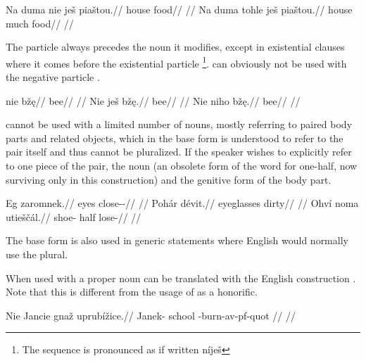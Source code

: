 \pex
\a
\begingl
\gla *Na duma nie ješ piaštou.//
\glb \Loc{} house   food//
\glft {}//
\endgl
\a
\begingl
\gla Na duma tohle ješ piaštou.//
\glb \Loc{} house much  food//
\glft {}//
\endgl
\xe

The particle  always precedes the noun it modifies, except in existential clauses where it comes before the existential particle \footnote{The sequence is pronounced as if written níješ }.  can obviously not be used with the negative particle .

\pex
\a
\begingl
\gla nie bž\k{e}//
\glb {} bee//
\glft {}//
\endgl
\a
\begingl
\gla Nie ješ bž\k{e}.//
\glb {}  bee//
\glft {}//
\endgl
\a
\begingl
\gla *Nie niho bž\k{e}.//
\glb {}  bee//
\glft {}//
\endgl
\xe

 cannot be used with a limited number of nouns, mostly referring to paired body parts and related objects, which in the base form is understood to refer to the pair itself and thus cannot be pluralized. If the speaker wishes to explicitly refer to one piece of the pair, the noun  (an obsolete form of the word for one-half, now surviving only in this construction) and the genitive form of the body part.

\pex
\begingl
\gla Eg zaromnek.//
\glb eyes close-\Pv{}-\Pf{}//
\glft {}//
\endgl
\xe
\pex
\begingl
\gla Pohár dévit.//
\glb eyeglasses dirty//
\glft {}//
\endgl
\xe
\pex
\begingl
\gla Ohví noma utieščál.//
\glb shoe-\Gen{} half lose-//
\glft {}//
\endgl
\xe

The base form is also used in generic statements where English would normally use the plural.


When used with a proper noun  can be translated with the English construction . Note that this is different from the usage of  as a honorific.

\pex
\begingl
    \gla Nie Jancie gnaž uprubížice.//
    \glb {} Janek-\Gen{} school -burn-{av-pf-quot} //
    \glft {}//
\endgl
\xe

